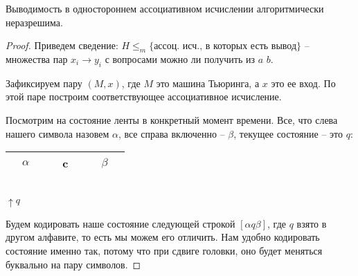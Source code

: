 \begin{theorem}
    Выводимость в одностороннем ассоциативном исчислении алгоритмически неразрешима.
\end{theorem}
\begin{proof}
    Приведем сведение: $H \leqslant_m \{\text{ассоц. исч., в которых есть вывод}\}$ -- множества пар $x_i \to y_i$ с вопросами можно ли получить из $a$ $b$.

    Зафиксируем пару $(M, x)$, где $M$ это машина Тьюринга, а $x$ это ее вход. По этой паре построим соответствующее ассоциативное исчисление.

    Посмотрим на состояние ленты в конкретный момент времени. Все, что слева нашего символа назовем $\alpha$, все справа включенно -- $\beta$, текущее состояние -- это $q$: 
    \begin{center}
        \begin{tabular}{|c|c|c|c|c|c|c|c|c|}
            \hline
             & $\alpha$ &  &  & c &  &  & $\beta$ & \\
            \hline
        \end{tabular}\\
        $\uparrow q$
    \end{center}
    Будем кодировать наше состояние следующей строкой $[\alpha q \beta]$, где $q$ взято в другом алфавите, то есть мы можем его отличить. 
    Нам удобно кодировать состояние именно так, потому что при сдвиге головки, оно будет меняться буквально на пару символов.


\end{proof}
